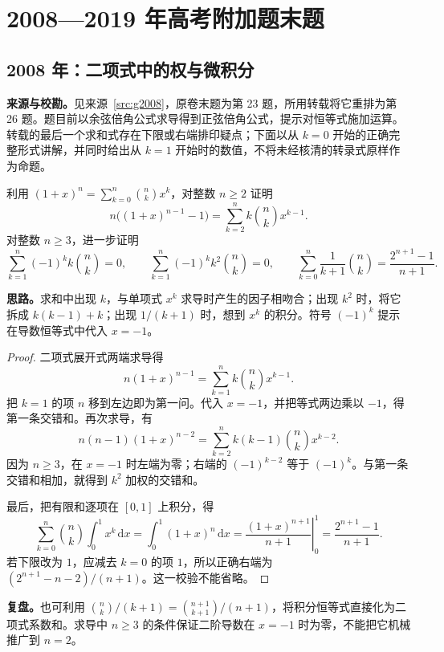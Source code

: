 \documentclass[UTF8,12pt,a4paper,fontset=fandol]{ctexart}
\begin{document}
\section{2008—2019 年高考附加题末题}\label{sec:gaokao}
\subsection{2008 年：二项式中的权与微积分}\label{sec:g2008}
\textbf{来源与校勘。}见来源~\ref{src:g2008}，原卷末题为第 23 题，所用转载将它重排为第 26 题。题目前以余弦倍角公式求导得到正弦倍角公式，提示对恒等式施加运算。转载的最后一个求和式存在下限或右端排印疑点；下面以从 $k=0$ 开始的正确完整形式讲解，并同时给出从 $k=1$ 开始时的数值，不将未经核清的转录式原样作为命题。

\begin{example}[题意与经校验的恒等式]
利用 $(1+x)^n=\sum_{k=0}^{n}\binom nkx^k$，对整数 $n\geq2$ 证明
\[
n\bigl((1+x)^{n-1}-1\bigr)=\sum_{k=2}^{n}k\binom nkx^{k-1}.
\]
对整数 $n\geq3$，进一步证明
\[
\sum_{k=1}^{n}(-1)^kk\binom nk=0,\qquad
\sum_{k=1}^{n}(-1)^kk^2\binom nk=0,
\qquad
\sum_{k=0}^{n}\frac{1}{k+1}\binom nk=\frac{2^{n+1}-1}{n+1}.
\]
\end{example}
\textbf{思路。}求和中出现 $k$，与单项式 $x^k$ 求导时产生的因子相吻合；出现 $k^2$ 时，将它拆成 $k(k-1)+k$；出现 $1/(k+1)$ 时，想到 $x^k$ 的积分。符号 $(-1)^k$ 提示在导数恒等式中代入 $x=-1$。
\begin{proof}
二项式展开式两端求导得
\[
n(1+x)^{n-1}=\sum_{k=1}^{n}k\binom nkx^{k-1}.
\]
把 $k=1$ 的项 $n$ 移到左边即为第一问。代入 $x=-1$，并把等式两边乘以 $-1$，得第一条交错和。再次求导，有
\[
n(n-1)(1+x)^{n-2}=\sum_{k=2}^{n}k(k-1)\binom nkx^{k-2}.
\]
因为 $n\geq3$，在 $x=-1$ 时左端为零；右端的 $(-1)^{k-2}$ 等于 $(-1)^k$。与第一条交错和相加，就得到 $k^2$ 加权的交错和。

最后，把有限和逐项在 $[0,1]$ 上积分，得
\[
\sum_{k=0}^{n}\binom nk\int_0^1x^k\,\mathrm dx
=\int_0^1(1+x)^n\,\mathrm dx
=\left.\frac{(1+x)^{n+1}}{n+1}\right|_0^1
=\frac{2^{n+1}-1}{n+1}.
\]
若下限改为 $1$，应减去 $k=0$ 的项 $1$，所以正确右端为 $(2^{n+1}-n-2)/(n+1)$。这一校验不能省略。
\end{proof}
\textbf{复盘。}也可利用 $\binom nk/(k+1)=\binom{n+1}{k+1}/(n+1)$，将积分恒等式直接化为二项式系数和。求导中 $n\geq3$ 的条件保证二阶导数在 $x=-1$ 时为零，不能把它机械推广到 $n=2$。
\end{document}
